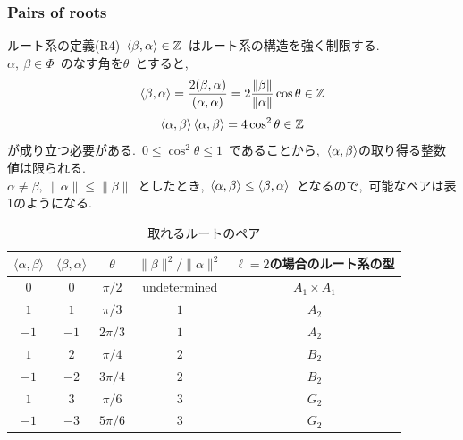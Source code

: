 \documentclass[uplatex,dvipdfmx]{jsarticle}
\begin{document}
\subsubsection{Pairs of roots}
ルート系の定義(R4)~$\ev{\beta,\alpha} \in \mathbb{Z}$~はルート系の構造を強く制限する.\\
$\alpha,~\beta \in \Phi$~のなす角を$\theta$~とすると,~
\begin{equation*}
    \ev{\beta,\alpha} = \frac{2(\beta,\alpha)}{(\alpha,\alpha)} = 2\frac{\|\beta\|}{\|\alpha\|}\cos\theta \in \mathbb{Z}
\end{equation*}
\begin{equation*}
    \ev{\alpha,\beta}\ev{\alpha,\beta} = 4\cos^2 \theta \in \mathbb{Z}
\end{equation*}
が成り立つ必要がある.~$0\leq \cos^2 \theta \leq 1$~であることから,~$\ev{\alpha,\beta}$の取り得る整数値は限られる.~\\
$\alpha \neq \beta,~\|\alpha\| \leq \|\beta\|$~としたとき,~$\ev{\alpha,\beta} \leq \ev{\beta,\alpha}$~となるので,~可能なペアは表1のようになる.\\
\begin{table}[htbp]
  \centering
  \caption{取れるルートのペア}
  \begin{tabular}{ccccc}
    \hline
    $\langle \alpha, \beta \rangle$ & $\langle \beta, \alpha \rangle$ & $\theta$ & $\|\beta\|^2 / \|\alpha\|^2$ & $\ell=2$の場合のルート系の型 \\
    \hline
    $0$ & $0$ & $\pi/2$ & undetermined & $A_1 \times A_1$ \\
    $1$ & $1$ & $\pi/3$ & $1$ & $A_2$ \\
    $-1$ & $-1$ & $2\pi/3$ & $1$ & $A_2$ \\
    $1$ & $2$ & $\pi/4$ & $2$ & $B_2$ \\
    $-1$ & $-2$ & $3\pi/4$ & $2$ & $B_2$ \\
    $1$ & $3$ & $\pi/6$ & $3$ & $G_2$ \\
    $-1$ & $-3$ & $5\pi/6$ & $3$ & $G_2$ \\
    \hline
  \end{tabular}
\end{table}
\end{document}
